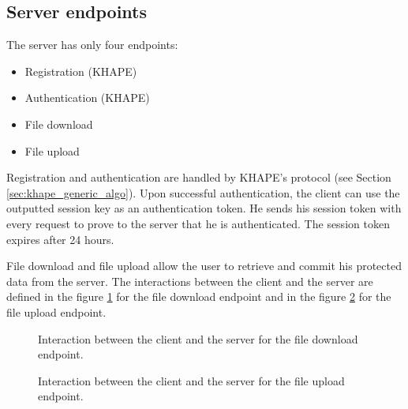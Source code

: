 ﻿\documentclass[../report.tex]{subfiles}
\begin{document}
\subsection{Server endpoints}
The server has only four endpoints:
\begin{itemize}
 \item Registration (KHAPE)
 \item Authentication (KHAPE)
 \item File download
 \item File upload
\end{itemize}
Registration and authentication are handled by KHAPE's protocol (see Section \ref{sec:khape_generic_algo}). Upon successful authentication, the client can use the outputted session key as an authentication token. He sends his session token with every request to prove to the server that he is authenticated. The session token expires after 24 hours.

File download and file upload allow the user to retrieve and commit his protected data from the server. The interactions between the client and the server are defined in the figure \ref{fig:usecase_download} for the file download endpoint and in the figure \ref{fig:usecase_upload} for the file upload endpoint.


\begin{figure}[h]
 \centering
 \setlength{\fboxsep}{10pt}
 \setlength{\fboxrule}{1pt}
 \caption{Interaction between the client and the server for the file download endpoint.}
 \label{fig:usecase_download}
\end{figure}

\begin{figure}[h]
 \centering
 \setlength{\fboxsep}{10pt}
 \setlength{\fboxrule}{1pt}
 \caption{Interaction between the client and the server for the file upload endpoint.}
 \label{fig:usecase_upload}
\end{figure}
\end{document}
